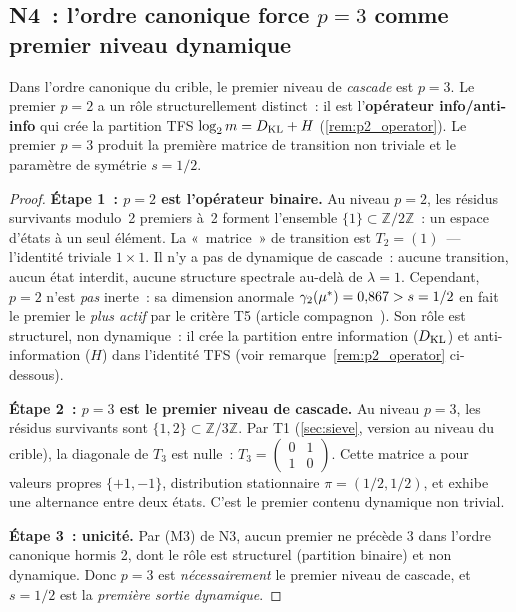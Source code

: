 \documentclass[12pt,a4paper]{article}
\begin{document}
\subsection{N4~: l'ordre canonique force $p = 3$ comme premier niveau dynamique}
\label{sec:N4}

\mTHM
\begin{theoreme}
\label{thm:N4}
Dans l'ordre canonique du crible, le premier niveau de
\emph{cascade} est $p = 3$. Le premier $p = 2$ a un rôle
structurellement distinct~: il est l'\textbf{opérateur info/anti-info}
qui crée la partition TFS $\log_2 m = D_{\mathrm{KL}} + H$
(\cref{rem:p2_operator}). Le premier $p = 3$ produit la première
matrice de transition non triviale et le paramètre de symétrie
$s = 1/2$.

\begin{proof}
\textbf{Étape 1~: $p = 2$ est l'opérateur binaire.}
Au niveau $p = 2$, les résidus survivants modulo~2 premiers à~2
forment l'ensemble $\{1\} \subset \mathbb{Z}/2\mathbb{Z}$~: un espace
d'états à un seul élément. La «~matrice~» de transition est
$T_2 = (1)$~--- l'identité triviale $1 \times 1$. Il n'y a pas de
dynamique de cascade~: aucune transition, aucun état interdit, aucune
structure spectrale au-delà de $\lambda = 1$.
Cependant, $p = 2$ n'est \emph{pas} inerte~: sa dimension anormale
$\gamma_2({\mu^{*}}) = 0{,}867 > s = 1/2$ en fait le premier le
\emph{plus actif} par le critère T5 (article
compagnon~\cite{companion_M3}). Son rôle est structurel, non
dynamique~: il crée la partition entre information ($D_{\mathrm{KL}}$) et
anti-information ($H$) dans l'identité TFS
(voir remarque~\ref{rem:p2_operator} ci-dessous).

\textbf{Étape 2~: $p = 3$ est le premier niveau de cascade.}
Au niveau $p = 3$, les résidus survivants sont
$\{1, 2\} \subset \mathbb{Z}/3\mathbb{Z}$. Par T1 (\cref{sec:sieve},
version au niveau du crible), la diagonale de $T_3$ est nulle~:
$T_3 = \begin{pmatrix} 0 & 1 \\ 1 & 0 \end{pmatrix}$.
Cette matrice a pour valeurs propres $\{+1, -1\}$, distribution
stationnaire $\pi = (1/2, 1/2)$, et exhibe une alternance entre
deux états. C'est le premier contenu dynamique non trivial.

\textbf{Étape 3~: unicité.}
Par (M3) de N3, aucun premier ne précède 3 dans l'ordre canonique
hormis 2, dont le rôle est structurel (partition binaire) et non
dynamique. Donc $p = 3$ est \emph{nécessairement} le premier niveau
de cascade, et $s = 1/2$ est la \emph{première sortie dynamique}.
\end{proof}
\end{theoreme}
\end{document}
